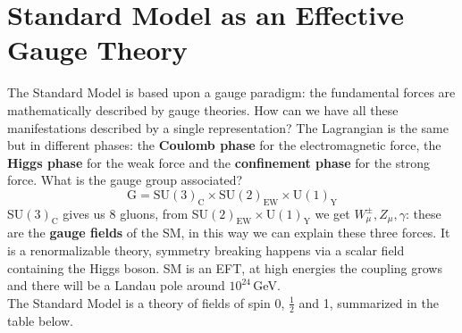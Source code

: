\documentclass[../main.tex]{subfiles}
\begin{document}
\section{Standard Model as an Effective Gauge Theory}
The Standard Model is based upon a gauge paradigm: the fundamental forces are mathematically described by gauge theories. How can we have all these manifestations described by a single representation? The Lagrangian is the same but in different phases: the \textbf{Coulomb phase} for the electromagnetic force, the \textbf{Higgs phase} for the weak force and the \textbf{confinement phase} for the strong force. What is the gauge group associated? 
\[
\text{G}=\text{SU}(3)_{\text{C}}\times\text{SU}(2)_{\text{EW}}\times\text{U}(1)_{\text{Y}}
\]
SU$(3)_{\text{C}}$ gives us 8 gluons, from SU$(2)_{\text{EW}}\times$U$(1)_{\text{Y}}$ we get $W_\mu^\pm, Z_\mu, \gamma$: these are the \textbf{gauge fields} of the SM, in this way we can explain these three forces. It is a renormalizable theory, symmetry breaking happens via a scalar field containing the Higgs boson. SM is an EFT, at high energies the coupling grows and there will be a Landau pole around $10^{24}$\,GeV.\\
The Standard Model is a theory of fields of spin 0, $\frac{1}{2}$ and 1, summarized in the table below.
\end{document}
